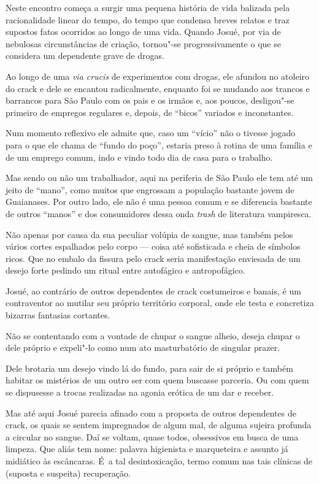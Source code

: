 \asterisc{}

Neste encontro começa a surgir uma pequena história de vida balizada pela
racionalidade linear do tempo, do tempo que condensa breves relatos e
traz supostos fatos ocorridos ao longo de uma vida. Quando Josué, por
via de nebulosas circunstâncias de criação, tornou"-se progressivamente o
que se considera um dependente grave de drogas.

Ao longo de uma \emph{via crucis} de experimentos com drogas, ele
afundou no atoleiro do crack e dele se encantou radicalmente, enquanto
foi se mudando aos trancos e barrancos para São Paulo com os pais e os
irmãos e, aos poucos, desligou"-se primeiro de empregos regulares e,
depois, de ``bicos'' variados e inconstantes.

Num momento reflexivo ele admite que, caso um ``vício'' não o tivesse
jogado para o que ele chama de ``fundo do poço'', estaria preso à rotina
de uma família e de um emprego comum, indo e vindo todo dia de casa para
o trabalho.

Mas sendo ou não um trabalhador, aqui na periferia de São Paulo ele tem
até um jeito de ``mano'', como muitos que engrossam a população bastante
jovem de Guaianases. Por outro lado, ele não é uma pessoa comum e se
diferencia bastante de outros ``manos'' e dos consumidores dessa onda
\emph{trash} de literatura vampiresca.

Não apenas por causa da sua peculiar volúpia de sangue, mas também pelos
vários cortes espalhados pelo corpo --- coisa até sofisticada e cheia de
símbolos ricos. Que no embalo da fissura pelo crack seria manifestação
enviesada de um desejo forte pedindo um ritual entre autofágico e
antropofágico.

Josué, ao contrário de outros dependentes de crack costumeiros e
banais, é um contraventor ao mutilar seu próprio território corporal, onde ele testa e concretiza bizarras fantasias cortantes.

Não se contentando com a vontade de chupar o sangue alheio, deseja
chupar o dele próprio e expeli"-lo como num ato masturbatório de singular
prazer.

Dele brotaria um desejo vindo lá do fundo, para sair de si próprio e
também habitar os mistérios de um outro ser com quem buscasse parceria.
Ou com quem se dispusesse a trocas realizadas na agonia erótica de um
dar e receber.

Mas até aqui Josué parecia afinado com a proposta de outros dependentes
de crack, os quais se sentem impregnados de algum mal, de alguma sujeira
profunda a circular no sangue. Daí se voltam, quase todos, obsessivos em
busca de uma limpeza. Que aliás tem nome: palavra higienista e
marqueteira e assunto já midiático às escâncaras. É~a tal
desintoxicação, termo comum nas tais clínicas de (suposta e suspeita)
recuperação.

